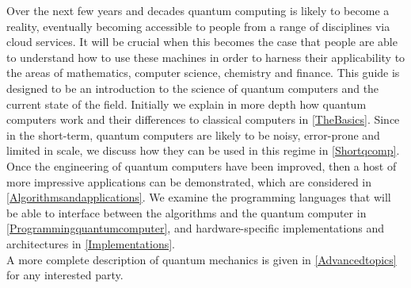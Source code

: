 Over the next few years and decades quantum computing is likely to become a reality, eventually becoming accessible to people from a range of disciplines via cloud services. It will be crucial when this becomes the case that people are able to understand how to use these machines in order to harness their applicability to the areas of mathematics, computer science, chemistry and finance. This guide is designed to be an introduction to the science of quantum computers and the current state of the field. Initially we explain in more depth how quantum computers work and their differences to classical computers in \autoref{TheBasics}. Since in the short-term, quantum computers are likely to be noisy, error-prone and limited in scale, we discuss how they can be used in this regime in \autoref{Shortqcomp}. \\

Once the engineering of quantum computers have been improved, then a host of more impressive applications can be demonstrated, which are considered in \autoref{Algorithmsandapplications}. We examine the programming languages that will be able to interface between the algorithms and the quantum computer in \autoref{Programmingquantumcomputer}, and hardware-specific implementations and architectures in \autoref{Implementations}. \\

A more complete description of quantum mechanics is given in \autoref{Advancedtopics} for any interested party. 

